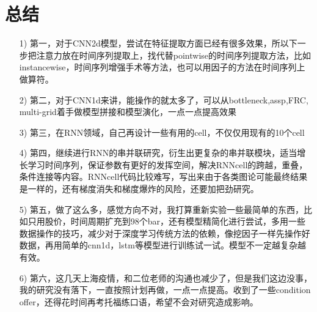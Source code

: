 \documentclass[11pt]{ctexart}
\begin{document}
\section{总结}
\begin{itemize}
  \item [1)]
  第一，对于CNN2d模型，尝试在特征提取方面已经有很多效果，所以下一步把注意力放在时间序列提取上，找代替pointwise的时间序列提取方法，比如instancewise，时间序列增强手术等方法，也可以用因子的方法在时间序列上做算符。
  \item [2)]
  第二，对于CNN1d来讲，能操作的就太多了，可以从bottleneck,assp,FRC, multi-grid着手做模型拼接和模型演化，一点一点提高效果
  \item [3)]
  第三，在RNN领域，自己再设计一些有用的cell，不仅仅用现有的10个cell
  \item [4)]
  第四，继续进行RNN的串并联研究，衍生出更复杂的串并联模块，适当增长学习时间序列，保证参数有更好的发挥空间，解决RNNcell的跨越，重叠，条件连接等内容。RNNcell代码比较难写，写出来由于各类图论可能最终结果是一样的，还有梯度消失和梯度爆炸的风险，还要加把劲研究。
  \item [5)]
  第五，做了这么多，感觉方向不对，我打算重新实验一些最简单的东西，比如只用股价，时间周期扩充到98个bar，还有模型精简化进行尝试，多用一些数据操作的技巧，减少对于深度学习传统方法的依赖，像挖因子一样先操作好数据，再用简单的cnn1d，lstm等模型进行训练试一试。模型不一定越复杂越有效。
  \item [6)]
  第六，这几天上海疫情，和二位老师的沟通也减少了，但是我们这边没事，我的研究没有落下，一直按照计划再做，一点一点提高。收到了一些condition offer，还得花时间再考托福练口语，希望不会对研究造成影响。

\end{itemize}
\end{document}
